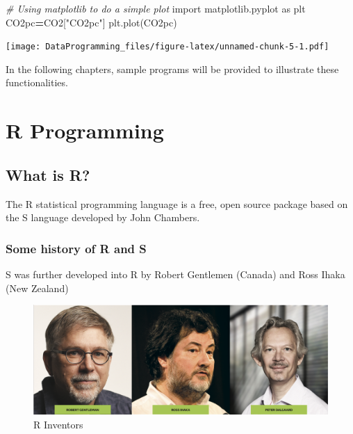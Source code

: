 \documentclass[]{book}
\newenvironment{Shaded}{\begin{snugshade}}{\end{snugshade}}
\newcommand{\CommentTok}[1]{\textcolor[rgb]{0.56,0.35,0.01}{\textit{#1}}}
\newcommand{\ImportTok}[1]{#1}
\newcommand{\NormalTok}[1]{#1}
\newcommand{\OperatorTok}[1]{\textcolor[rgb]{0.81,0.36,0.00}{\textbf{#1}}}
\newcommand{\StringTok}[1]{\textcolor[rgb]{0.31,0.60,0.02}{#1}}
\begin{document}
\begin{Shaded}
\begin{Highlighting}[]
\CommentTok{# Using matplotlib to do a simple plot}
\ImportTok{import}\NormalTok{ matplotlib.pyplot }\ImportTok{as}\NormalTok{ plt}
\NormalTok{CO2pc}\OperatorTok{=}\NormalTok{CO2[}\StringTok{"CO2pc"}\NormalTok{]}
\NormalTok{plt.plot(CO2pc)}
\end{Highlighting}
\end{Shaded}

\texttt{[image: DataProgramming\_files/figure-latex/unnamed-chunk-5-1.pdf]}

In the following chapters, sample programs will be provided to illustrate these functionalities.

\hypertarget{r-programming}{%
\chapter{R Programming}\label{r-programming}}

\hypertarget{what-is-r}{%
\section{What is R?}\label{what-is-r}}

The R statistical programming language is a free, open source package based on the S language developed by John Chambers.

\hypertarget{some-history-of-r-and-s}{%
\subsection{Some history of R and S}\label{some-history-of-r-and-s}}

S was further developed into R by Robert Gentlemen (Canada) and Ross Ihaka (New Zealand)

\begin{figure}
\includegraphics[width=1\linewidth]{Rinventors} \caption{R Inventors}\label{fig:Rinventors}
\end{figure}
\end{document}
